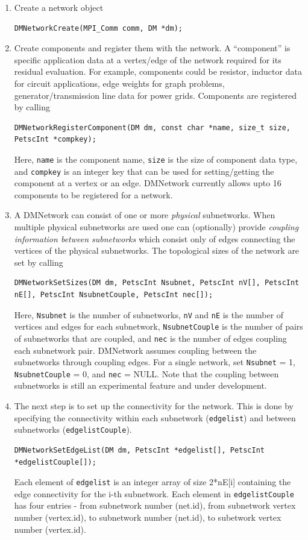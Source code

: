 \begin{enumerate}
  \item Create a network object
\begin{lstlisting}
DMNetworkCreate(MPI_Comm comm, DM *dm);
\end{lstlisting}
  \item Create components and register them with the network. A ``component'' is specific application data at a vertex/edge of the network required for its residual evaluation. For example, components could be resistor, inductor data for circuit applications, edge weights for graph problems, generator/transmission line data for power grids. Components are registered by calling
\begin{lstlisting}
DMNetworkRegisterComponent(DM dm, const char *name, size_t size, PetscInt *compkey);
\end{lstlisting}
  Here, \lstinline{name} is the component name, \lstinline{size} is the size of component data type, and \lstinline{compkey} is an integer key that can be used for setting/getting the component at a vertex or an edge. DMNetwork currently allows upto 16 components to be registered for a network.

  \item A DMNetwork can consist of one or more {\em physical} subnetworks. When multiple physical subnetworks are used one can (optionally) provide {\em coupling information between subnetworks} which consist only of edges connecting the vertices of the physical subnetworks. The topological sizes of the network are set by calling
\begin{lstlisting}
DMNetworkSetSizes(DM dm, PetscInt Nsubnet, PetscInt nV[], PetscInt nE[], PetscInt NsubnetCouple, PetscInt nec[]);
\end{lstlisting}
Here, \lstinline{Nsubnet} is the number of subnetworks, \lstinline{nV} and \lstinline{nE} is the number of vertices and edges for each subnetwork, \lstinline{NsubnetCouple} is the number of pairs of subnetworks that are coupled, and \lstinline{nec} is the number of edges coupling each subnetwork pair. DMNetwork assumes coupling between the subnetworks through coupling edges. For a single network, set \lstinline{Nsubnet} = 1, \lstinline{NsubnetCouple} = 0, and \lstinline{nec} = NULL. Note that the coupling between subnetworks is still an experimental feature and under development.
  \item The next step is to set up the connectivity for the network. This is done by specifying the connectivity within each subnetwork (\lstinline{edgelist}) and between subnetworks (\lstinline{edgelistCouple}).
\begin{lstlisting}
DMNetworkSetEdgeList(DM dm, PetscInt *edgelist[], PetscInt *edgelistCouple[]);
\end{lstlisting}
Each element of \lstinline{edgelist} is an integer array of size 2*nE[i] containing the edge connectivity for the i-th subnetwork. Each element in \lstinline{edgelistCouple} has four entries - {from subnetwork number (net.id), from subnetwork vertex number (vertex.id), to subnetwork number (net.id), to subetwork vertex number (vertex.id)}.


\end{enumerate}
